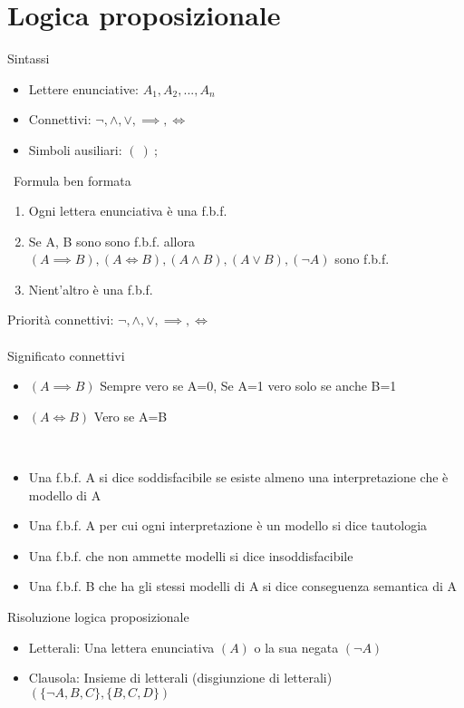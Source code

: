 \documentclass{article}
\begin{document}
	 	\section{Logica proposizionale}
	 	
	 	{\large Sintassi}
	 	\begin{itemize}
	 		\item Lettere enunciative: \( A_1, A_2, ... , A_n\) 
	 		\item Connettivi: \(\neg, \land, \lor, \implies, \iff \)
	 		\item Simboli ausiliari: \( (\ )\ ; \)
	 	\end{itemize}
 		\
 		{\large Formula ben formata}
 		\begin{enumerate}
 			\item Ogni lettera enunciativa è una f.b.f.
 			\item Se A, B sono sono f.b.f. allora \( (A\implies B),(A \iff B) , (A \land B), (A\lor B), (\neg A) \) sono f.b.f.
 			\item Nient'altro è una f.b.f.
 		\end{enumerate}
 		
 		{\large Priorità connettivi: \(\neg, \land, \lor, \implies, \iff \)}\\\\
 		Significato connettivi
 		\begin{itemize}
 			\item \( (A\implies B) \) Sempre vero se A=0, Se A=1 vero solo se anche B=1
 			\item \( (A\iff B) \) Vero se A=B
 		\end{itemize}
 		\
 		
 		\begin{itemize}
 			\item Una f.b.f. A si dice soddisfacibile se esiste almeno una interpretazione che è modello di A
 			\item Una f.b.f. A per cui ogni interpretazione è un modello si dice tautologia
 			\item Una f.b.f. che non ammette modelli si dice insoddisfacibile 
 			\item Una f.b.f. B che ha gli stessi modelli di A si dice conseguenza semantica di A
 		\end{itemize}
 		
 		{\large Risoluzione logica proposizionale}
 		
 		\begin{itemize}
 			\item Letterali: Una lettera enunciativa \((A)\) o la sua negata \((\neg A)\)
 			\item Clausola: Insieme di letterali (disgiunzione di letterali) \( (\{\neg A,B,C\},\{B,C,D\}) \)
 		\end{itemize}
 		
\end{document}
